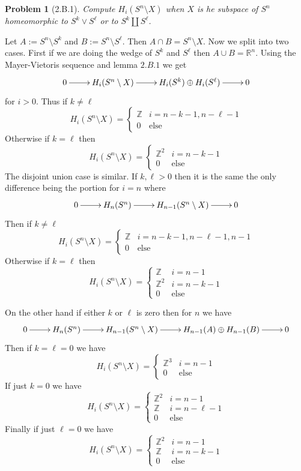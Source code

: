 \documentclass[10pt]{article}
\newcommand{\sk}{\vskip 10mm}
\newcommand{\bb}[1]{\mathbb{#1}}
\theoremstyle{plain}
\newtheorem{problem}{Problem}
\theoremstyle{remark}
\begin{document}
\sk

\begin{problem}[2.B.1]
  Compute $H_i(S^n\setminus X)$ when $X$ is he subspace of $S^n$ homeomorphic to
  $S^k\vee S^\ell$ or to $S^k\coprod S^\ell$.
\end{problem}

Let $A:=S^n\setminus S^k$ and $B:=S^n\setminus S^\ell$. Then $A\cap B= S^n\setminus X$. Now
we split into two cases. First if we are doing the wedge of
$S^k$ and $S^\ell$ then $A\cup B=\bb{R}^n$. Using the Mayer-Vietoris
sequence and lemma $2.B.1$ we get
\[
  \xymatrix{
    0 \ar[r] & H_i(S^n\setminus X) \ar[r] & H_i(S^k)\oplus H_i(S^\ell) \ar[r] & 0
  }
\]
for $i>0$. Thus if $k\neq \ell$
\[
  H_i(S^n\setminus X) =
  \left\{
    \begin{array}{lr}
      \bb{Z}& i=n-k-1,n-\ell-1\\
      0 & \text{else}
    \end{array}
  \right.
\]
Otherwise if $k=\ell$ then
\[
  H_i(S^n\setminus X) =
  \left\{
    \begin{array}{lr}
      \bb{Z}^2& i=n-k-1\\
      0 & \text{else}
    \end{array}
  \right.
\]
The disjoint union case is similar. If $k,\ell>0$ then it
is the same the only difference being the portion for $i=n$ where
\[
  \xymatrix{
    0 \ar[r] & H_{n}(S^n) \ar[r] & H_{n-1}(S^n\setminus X) \ar[r] & 0
  }
\]
Then if $k\neq \ell$
\[
  H_i(S^n\setminus X) =
  \left\{
    \begin{array}{lr}
      \bb{Z}& i=n-k-1,n-\ell-1,n-1\\
      0 & \text{else}
    \end{array}
  \right.
\]
Otherwise if $k=\ell$ then
\[
  H_i(S^n\setminus X) =
  \left\{
    \begin{array}{lr}
      \bb{Z} & i=n-1\\
      \bb{Z}^2& i=n-k-1\\
      0 & \text{else}
    \end{array}
  \right.
\]

On the other hand if either $k$ or $\ell$ is zero then for $n$ we have
\[
  \xymatrix{
    0 \ar[r] & H_{n}(S^n) \ar[r] & H_{n-1}(S^n\setminus X) \ar[r] & H_{n-1}(A)\oplus H_{n-1}(B) \ar[r] & 0
  }
\]
Then if $k=\ell=0$ we have
\[
  H_i(S^n\setminus X) =
  \left\{
    \begin{array}{lr}
      \bb{Z}^3& i=n-1\\
      0 & \text{else}
    \end{array}
  \right.
\]
If just $k=0$ we have
\[
  H_i(S^n\setminus X) =
  \left\{
    \begin{array}{lr}
      \bb{Z}^2& i=n-1\\
      \bb{Z} & i=n-\ell-1\\
      0 & \text{else}
    \end{array}
  \right.
\]
Finally if just $\ell=0$ we have
\[
  H_i(S^n\setminus X) =
  \left\{
    \begin{array}{lr}
      \bb{Z}^2& i=n-1\\
      \bb{Z} & i=n-k-1\\
      0 & \text{else}
    \end{array}
  \right.
\]

\end{document}
